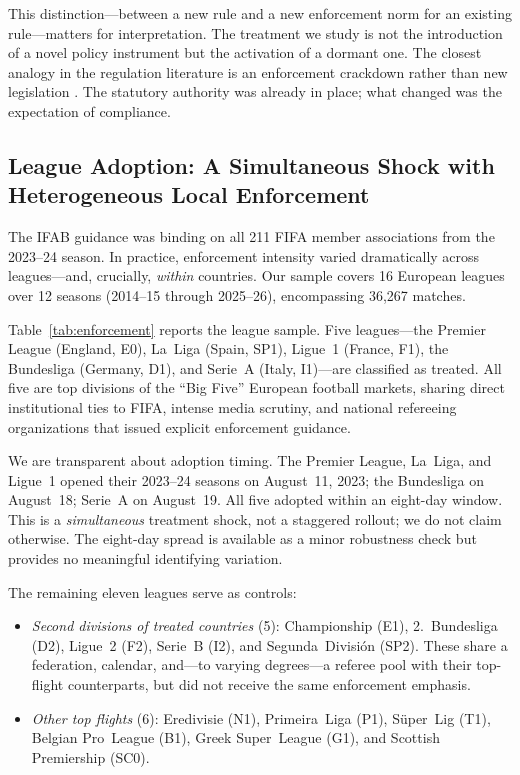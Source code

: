 This distinction---between a new rule and a new enforcement norm for an
existing rule---matters for interpretation. The treatment we study is not
the introduction of a novel policy instrument but the activation of a
dormant one. The closest analogy in the regulation literature is an
enforcement crackdown rather than new legislation \citep{johnson2020compliance,
greenstone2004did}. The statutory authority was already in place; what
changed was the expectation of compliance.

\subsection{League Adoption: A Simultaneous Shock with Heterogeneous Local
Enforcement}

The IFAB guidance was binding on all 211 FIFA member associations from the
2023--24 season. In practice, enforcement intensity varied dramatically
across leagues---and, crucially, \textit{within} countries. Our sample
covers 16 European leagues over 12 seasons (2014--15 through 2025--26),
encompassing 36,267 matches.

Table~\ref{tab:enforcement} reports the league sample. Five leagues---the
Premier League (England, E0), La~Liga (Spain, SP1), Ligue~1 (France, F1),
the Bundesliga (Germany, D1), and Serie~A (Italy, I1)---are classified as
treated. All five are top divisions of the ``Big Five'' European football
markets, sharing direct institutional ties to FIFA, intense media scrutiny,
and national refereeing organizations that issued explicit enforcement
guidance.

We are transparent about adoption timing. The Premier League, La~Liga,
and Ligue~1 opened their 2023--24 seasons on August~11, 2023; the
Bundesliga on August~18; Serie~A on August~19. All five adopted within an
eight-day window. This is a \textit{simultaneous} treatment shock, not a
staggered rollout; we do not claim otherwise. The eight-day spread is
available as a minor robustness check but provides no meaningful
identifying variation.

The remaining eleven leagues serve as controls:

\begin{itemize}[leftmargin=*]
  \item \textit{Second divisions of treated countries} (5):
    Championship (E1), 2.~Bundesliga (D2), Ligue~2 (F2), Serie~B (I2),
    and Segunda~Divisi\'{o}n (SP2). These share a federation, calendar,
    and---to varying degrees---a referee pool with their top-flight
    counterparts, but did not receive the same enforcement emphasis.
  \item \textit{Other top flights} (6): Eredivisie (N1), Primeira~Liga
    (P1), S\"{u}per~Lig (T1), Belgian Pro~League (B1), Greek
    Super~League (G1), and Scottish Premiership (SC0).
\end{itemize}


